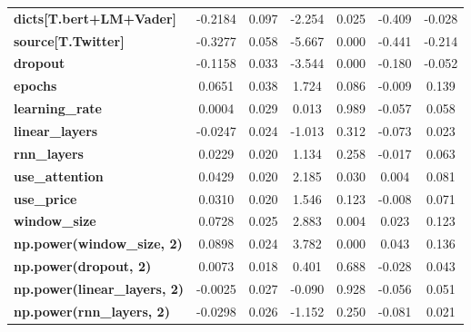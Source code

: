 \begin{center}
\begin{tabular}{lcccccc}
\textbf{dicts[T.bert+LM+Vader]}      &      -0.2184  &        0.097     &    -2.254  &         0.025        &       -0.409    &       -0.028     \\
\textbf{source[T.Twitter]}           &      -0.3277  &        0.058     &    -5.667  &         0.000        &       -0.441    &       -0.214     \\
\textbf{dropout}                     &      -0.1158  &        0.033     &    -3.544  &         0.000        &       -0.180    &       -0.052     \\
\textbf{epochs}                      &       0.0651  &        0.038     &     1.724  &         0.086        &       -0.009    &        0.139     \\
\textbf{learning\_rate}              &       0.0004  &        0.029     &     0.013  &         0.989        &       -0.057    &        0.058     \\
\textbf{linear\_layers}              &      -0.0247  &        0.024     &    -1.013  &         0.312        &       -0.073    &        0.023     \\
\textbf{rnn\_layers}                 &       0.0229  &        0.020     &     1.134  &         0.258        &       -0.017    &        0.063     \\
\textbf{use\_attention}              &       0.0429  &        0.020     &     2.185  &         0.030        &        0.004    &        0.081     \\
\textbf{use\_price}                  &       0.0310  &        0.020     &     1.546  &         0.123        &       -0.008    &        0.071     \\
\textbf{window\_size}                &       0.0728  &        0.025     &     2.883  &         0.004        &        0.023    &        0.123     \\
\textbf{np.power(window\_size, 2)}   &       0.0898  &        0.024     &     3.782  &         0.000        &        0.043    &        0.136     \\
\textbf{np.power(dropout, 2)}        &       0.0073  &        0.018     &     0.401  &         0.688        &       -0.028    &        0.043     \\
\textbf{np.power(linear\_layers, 2)} &      -0.0025  &        0.027     &    -0.090  &         0.928        &       -0.056    &        0.051     \\
\textbf{np.power(rnn\_layers, 2)}    &      -0.0298  &        0.026     &    -1.152  &         0.250        &       -0.081    &        0.021     \\

\end{tabular}
\end{center}
